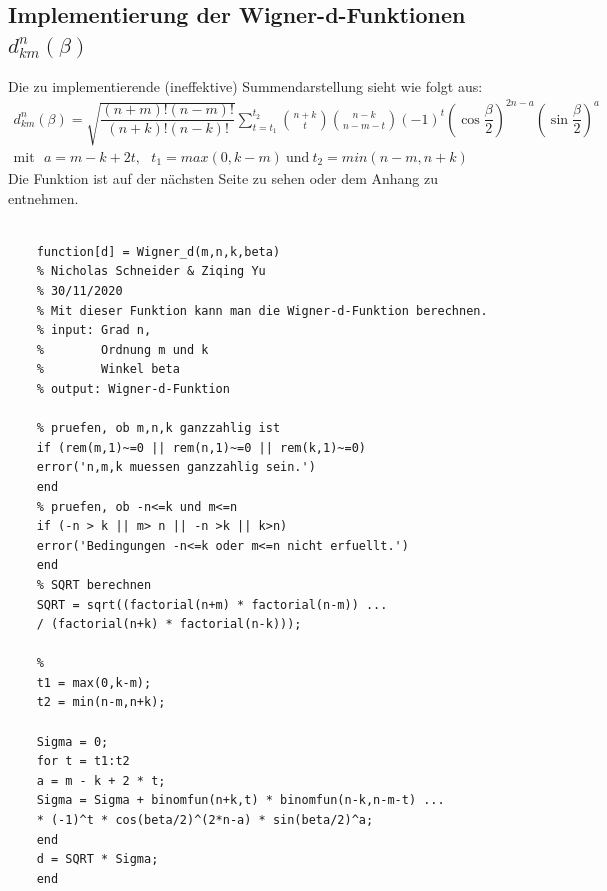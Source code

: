 \subsection{Implementierung der Wigner-d-Funktionen $d_{km}^n(\beta)$}
Die zu implementierende (ineffektive) Summendarstellung sieht wie folgt aus: 
\begin{gather}
d_{km}^n(\beta) = \sqrt{\dfrac{(n+m)!(n-m)!}{(n+k)!(n-k)!}} \sum_{t=t_1}^{t_2} \binom{n+k}{t} \binom{n-k}{n-m-t} (-1)^t \left( \cos \dfrac{\beta}{2} \right)^{2n-a} \left( \sin \dfrac{\beta}{2} \right)^a \\
\text{mit} ~~~ a = m-k+2t, ~~~ t_1 = max(0,k-m) ~ \text{und} ~ t_2 = min(n-m, n+k)
\end{gather}
Die Funktion ist auf der nächsten Seite zu sehen oder dem Anhang zu entnehmen. 
\begin{lstlisting}

	function[d] = Wigner_d(m,n,k,beta)
	% Nicholas Schneider & Ziqing Yu
	% 30/11/2020
	% Mit dieser Funktion kann man die Wigner-d-Funktion berechnen. 
	% input: Grad n,
	%        Ordnung m und k
	%        Winkel beta	
	% output: Wigner-d-Funktion

	% pruefen, ob m,n,k ganzzahlig ist
	if (rem(m,1)~=0 || rem(n,1)~=0 || rem(k,1)~=0)
	error('n,m,k muessen ganzzahlig sein.')
	end
	% pruefen, ob -n<=k und m<=n
	if (-n > k || m> n || -n >k || k>n)
	error('Bedingungen -n<=k oder m<=n nicht erfuellt.')
	end
	% SQRT berechnen
	SQRT = sqrt((factorial(n+m) * factorial(n-m)) ...
	/ (factorial(n+k) * factorial(n-k)));
	
	%
	t1 = max(0,k-m);
	t2 = min(n-m,n+k);
	
	Sigma = 0;
	for t = t1:t2
	a = m - k + 2 * t;
	Sigma = Sigma + binomfun(n+k,t) * binomfun(n-k,n-m-t) ...
	* (-1)^t * cos(beta/2)^(2*n-a) * sin(beta/2)^a;
	end
	d = SQRT * Sigma;
	end
\end{lstlisting}
